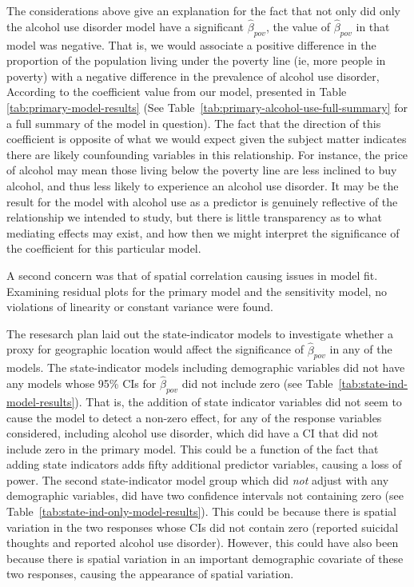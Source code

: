 \documentclass{article}
\begin{document}
The considerations above give an explanation for the fact that
not only did only the alcohol use disorder model have a
significant $\hat{\beta}_{pov}$, the value of $\hat{\beta}_{pov}$
in that model was negative.
That is, we would associate a positive difference in
the proportion of the population living under the poverty line
(ie, more people in poverty)
with a negative difference in the prevalence of alcohol use disorder,
According to the coefficient value from our model, presented in
Table \ref{tab:primary-model-results}
(See Table~\ref{tab:primary-alcohol-use-full-summary} for a full
summary of the model in question).
The fact that the direction of this coefficient is opposite of
what we would expect given the subject matter
indicates there are likely counfounding variables in this relationship.
For instance, the price of alcohol may mean those living below
the poverty line are less inclined to buy alcohol,
and thus less likely to experience an alcohol use disorder.
It may be the result for the model with alcohol use as
a predictor is genuinely reflective of the relationship
we intended to study, but there is little transparency
as to what mediating effects may exist,
and how then we might interpret the significance of
the coefficient for this particular model.

A second concern was that of spatial correlation
causing issues in model fit.
Examining residual plots for the primary model
and the sensitivity model,
no violations of linearity
or constant variance were found.


The resesarch plan laid out the state-indicator
models to investigate whether a proxy for geographic
location would affect the significance of
$\hat{\beta}_{pov}$
in any of the models.
The state-indicator models including demographic variables
did not have any models whose 95\% CIs for
$\hat{\beta}_{pov}$
did not include zero
(see Table~\ref{tab:state-ind-model-results}).
That is, the addition of state indicator variables did
not seem to cause the model to detect a non-zero effect,
for any of the response variables considered,
including alcohol use disorder, which did have a
CI that did not include zero in the primary model.
This could be a function of the fact that adding
state indicators adds fifty additional predictor
variables, causing a loss of power.
The second state-indicator model group
which did \textit{not} adjust with any demographic variables,
did have two confidence intervals not containing zero
(see Table~\ref{tab:state-ind-only-model-results}).
This could be because there is spatial variation
in the two responses whose CIs did not contain zero
(reported suicidal thoughts and reported alcohol use disorder).
However, this could have also been because there is
spatial variation in an important demographic covariate of
these two responses, causing the appearance of spatial variation.
\end{document}
